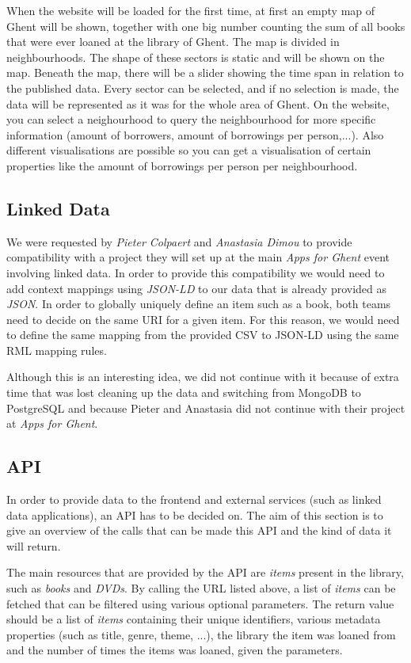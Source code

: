 When the website will be loaded for the first time, at first an empty map of Ghent will be shown, together with one big number counting the sum of all books that were ever loaned at the library of Ghent. The map is divided in neighbourhoods. The shape of these sectors is static and will be shown on the map. Beneath the map, there will be a slider showing the time span in relation to the published data. Every sector can be selected, and if no selection is made, the data will be represented as it was for the whole area of Ghent.  On the website, you can select a neighourhood to query the neighbourhood for more specific information (amount of borrowers, amount of borrowings per person,...). Also different visualisations are possible so you can get a visualisation of certain properties like the amount of borrowings per person per neighbourhood.

\subsection{Linked Data}

We were requested by \emph{Pieter Colpaert} and \emph{Anastasia Dimou} to provide compatibility with a project they will set up at the main \emph{Apps for Ghent} event involving linked data. In order to provide this compatibility we would need to add context mappings using \emph{JSON-LD} to our data that is already provided as \emph{JSON}. In order to globally uniquely define an item such as a book, both teams need to decide on the same URI for a given item. For this reason, we would need to define the same mapping from the provided CSV to JSON-LD using the same RML mapping rules.

Although this is an interesting idea, we did not continue with it because of extra time that was lost cleaning up the data and switching from MongoDB to PostgreSQL and because Pieter and Anastasia did not continue with their project at \emph{Apps for Ghent}.

\subsection{API}

In order to provide data to the frontend and external services (such as linked data applications), an API has to be decided on. The aim of this section is to give an overview of the calls that can be made this API and the kind of data it will return.

The main resources that are provided by the API are \emph{items} present in the library, such as \emph{books} and \emph{DVDs}.
By calling the URL listed above, a list of \emph{items} can be fetched that can be filtered using various optional parameters.
The return value should be a list of \emph{items} containing their unique identifiers, various metadata properties (such as title, genre, theme, ...), the library the item was loaned from and the number of times the items was loaned, given the parameters.\\


